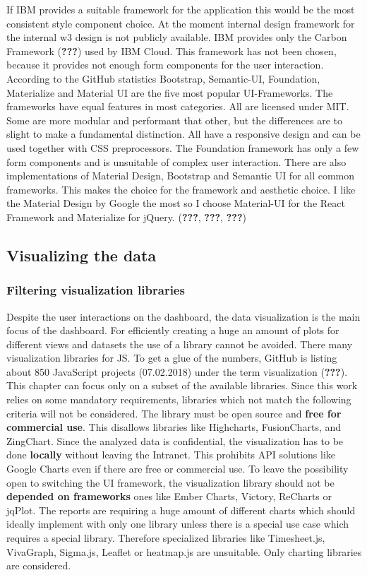 \documentclass[american,a4paper,oneside,,tablecaptionabove]{scrbook}
\begin{document}
If IBM provides a suitable framework for the application this would be
the most consistent style component choice. At the moment internal
design framework for the internal w3 design is not publicly available.
IBM provides only the Carbon Framework ({\textbf{???}}) used by IBM
Cloud. This framework has not been chosen, because it provides not
enough form components for the user interaction. According to the GitHub
statistics Bootstrap, Semantic-UI, Foundation, Materialize and Material
UI are the five most popular UI-Frameworks. The frameworks have equal
features in most categories. All are licensed under MIT. Some are more
modular and performant that other, but the differences are to slight to
make a fundamental distinction. All have a responsive design and can be
used together with CSS preprocessors. The Foundation framework has only
a few form components and is unsuitable of complex user interaction.
There are also implementations of Material Design, Bootstrap and
Semantic UI for all common frameworks. This makes the choice for the
framework and aesthetic choice. I like the Material Design by Google the
most so I choose Material-UI for the React Framework and Materialize for
jQuery. ({\textbf{???}}, \textbf{???}, \textbf{???})

\subsection{Visualizing the data}\label{visualizing-the-data}

\subsubsection{Filtering visualization
libraries}\label{filtering-visualization-libraries}

Despite the user interactions on the dashboard, the data visualization
is the main focus of the dashboard. For efficiently creating a huge an
amount of plots for different views and datasets the use of a library
cannot be avoided. There many visualization libraries for JS. To get a
glue of the numbers, GitHub is listing about 850 JavaScript projects
(07.02.2018) under the term visualization ({\textbf{???}}). This chapter
can focus only on a subset of the available libraries. Since this work
relies on some mandatory requirements, libraries which not match the
following criteria will not be considered. The library must be open
source and \textbf{free for commercial use}. This disallows libraries
like Highcharts, FusionCharts, and ZingChart. Since the analyzed data is
confidential, the visualization has to be done \textbf{locally} without
leaving the Intranet. This prohibits API solutions like Google Charts
even if there are free or commercial use. To leave the possibility open
to switching the UI framework, the visualization library should not be
\textbf{depended on frameworks} ones like Ember Charts, Victory,
ReCharts or jqPlot. The reports are requiring a huge amount of different
charts which should ideally implement with only one library unless there
is a special use case which requires a special library. Therefore
specialized libraries like Timesheet.js, VivaGraph, Sigma.js, Leaflet or
heatmap.js are unsuitable. Only charting libraries are considered.
\end{document}
